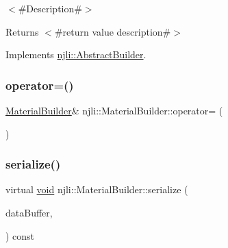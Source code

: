 $<$\#\+Description\#$>$

\begin{DoxyReturn}{Returns}
$<$\#return value description\#$>$ 
\end{DoxyReturn}


Implements \mbox{\hyperlink{classnjli_1_1_abstract_builder_a3e6e553e06d1ca30517ad5fb0bd4d000}{njli\+::\+Abstract\+Builder}}.

\mbox{\label{classnjli_1_1_material_builder_aaa2c67d1966ebcea7277957e918ed831}} 
\subsubsection{\texorpdfstring{operator=()}{operator=()}}
{\footnotesize\ttfamily \mbox{\hyperlink{classnjli_1_1_material_builder}{Material\+Builder}}\& njli\+::\+Material\+Builder\+::operator= (\begin{DoxyParamCaption}\item[{const \mbox{\hyperlink{classnjli_1_1_material_builder}{Material\+Builder}} \&}]{ }\end{DoxyParamCaption})\hspace{0.3cm}{\ttfamily [protected]}}

\mbox{\label{classnjli_1_1_material_builder_a469bb521d641ccf253538c4d0e914f58}} 
\subsubsection{\texorpdfstring{serialize()}{serialize()}}
{\footnotesize\ttfamily virtual \mbox{\hyperlink{_thread_8h_af1e856da2e658414cb2456cb6f7ebc66}{void}} njli\+::\+Material\+Builder\+::serialize (\begin{DoxyParamCaption}\item[{\mbox{\hyperlink{_thread_8h_af1e856da2e658414cb2456cb6f7ebc66}{void}} $\ast$}]{data\+Buffer,  }\item[{bt\+Serializer $\ast$}]{ }\end{DoxyParamCaption}) const\hspace{0.3cm}{\ttfamily [virtual]}}




